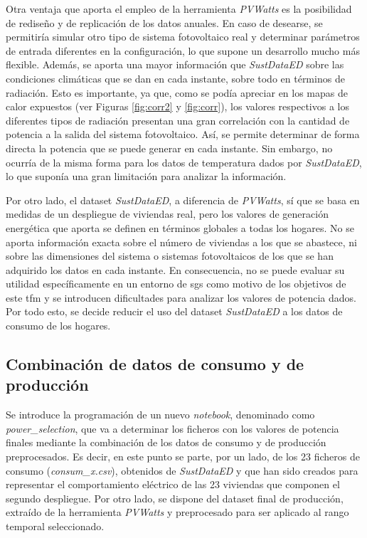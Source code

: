\vspace{3mm}
\pagebreak

Otra ventaja que aporta el empleo de la herramienta \textit{PVWatts} es la posibilidad de rediseño y de replicación de los datos anuales. En caso de desearse, se permitiría simular otro tipo de sistema fotovoltaico real y determinar parámetros de entrada diferentes en la configuración, lo que supone un desarrollo mucho más flexible. Además, se aporta una mayor información que \textit{SustDataED} sobre las condiciones climáticas que se dan en cada instante, sobre todo en términos de radiación. Esto es importante, ya que, como se podía apreciar en los mapas de calor expuestos (ver Figuras \ref{fig:corr2} y \ref{fig:corr}), los valores respectivos a los diferentes tipos de radiación presentan una gran correlación con la cantidad de potencia a la salida del sistema fotovoltaico. Así, se permite determinar de forma directa la potencia que se puede generar en cada instante. Sin embargo, no ocurría de la misma forma para los datos de  temperatura dados por \textit{SustDataED}, lo que suponía una gran limitación para analizar la información.

\vspace{3mm}

Por otro lado, el dataset \textit{SustDataED}, a diferencia de \textit{PVWatts}, sí que se basa en medidas de un despliegue de viviendas real, pero los valores de generación energética que aporta se definen en términos globales a todas los hogares. No se aporta información exacta sobre el número de viviendas a los que se abastece, ni sobre las dimensiones del sistema o sistemas fotovoltaicos de los que se han adquirido los datos en cada instante. En consecuencia, no se puede evaluar su utilidad específicamente en un entorno de \gls{sg}s como motivo de los objetivos de este \gls{tfm} y se introducen dificultades para analizar los valores de potencia dados. Por todo esto, se decide reducir el uso del dataset \textit{SustDataED} a los datos de consumo de los hogares.

\subsection{Combinación de datos de consumo y de producción}
\label{sec:combinacion}

Se introduce la programación de un nuevo \textit{notebook}, denominado como \textit{power\_selection}, que va a determinar los ficheros con los valores de potencia finales mediante la combinación de los datos de consumo y de producción preprocesados. Es decir, en este punto se parte, por un lado, de los 23 ficheros de consumo (\textit{consum\_x.csv}), obtenidos de \textit{SustDataED} y que han sido creados para representar el comportamiento eléctrico de las 23 viviendas que componen el segundo despliegue. Por otro lado, se dispone del dataset final de producción, extraído de la herramienta \textit{PVWatts} y preprocesado para ser aplicado al rango temporal seleccionado. 


